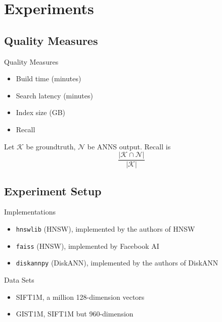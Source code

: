 \section{Experiments}

\subsection{Quality Measures}

\begin{frame}{Quality Measures}
    \begin{itemize}
        \item Build time (minutes)
        \item Search latency (minutes)
        \item Index size (GB)
        \item Recall
    \end{itemize}
\end{frame}

\begin{frame}
    \begin{definition}[Recall]
        Let \(\mathcal{K}\) be groundtruth, \(\mathcal{N}\) be ANNS output. Recall is
        \[
            \frac{|\mathcal{K} \cap \mathcal{N}|}{|\mathcal{K}|}
        \]
    \end{definition}
\end{frame}

\subsection{Experiment Setup}

\begin{frame}{Implementations}
    \begin{itemize}
        \item \texttt{hnswlib} (HNSW), implemented by the authors of HNSW
        \item \texttt{faiss} (HNSW), implemented by Facebook AI
        \item \texttt{diskannpy} (DiskANN), implemented by the authors of DiskANN
    \end{itemize}
\end{frame}

\begin{frame}{Data Sets}
    \begin{itemize}
        \item SIFT1M, a million 128-dimension vectors
        \item GIST1M, SIFT1M but 960-dimension
    \end{itemize}
\end{frame}

